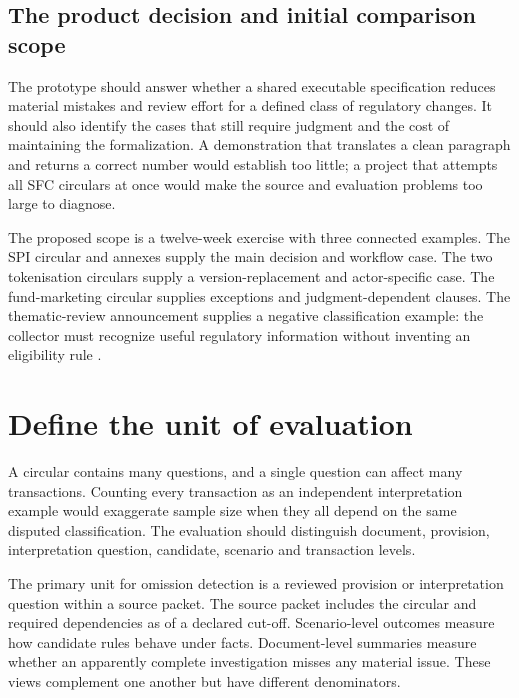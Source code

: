 \subsection{The product decision and initial comparison scope}
\label{merge:P-04-prototype:00}

\label{sec:prototype}

The prototype should answer whether a shared executable specification reduces
material mistakes and review effort for a defined class of regulatory changes.
It should also identify the cases that still require judgment and the cost of
maintaining the formalization. A demonstration that translates a clean paragraph
and returns a correct number would establish too little; a project that attempts
all SFC circulars at once would make the source and evaluation problems too large
to diagnose.

The proposed scope is a twelve-week exercise with three connected examples. The
SPI circular and annexes supply the main decision and workflow case. The two
tokenisation circulars supply a version-replacement and actor-specific case.
The fund-marketing circular supplies exceptions and judgment-dependent clauses.
The thematic-review announcement supplies a negative classification example:
the collector must recognize useful regulatory information without inventing an
eligibility rule \citep{sfcspi,sfctoken2023,sfctoken2026,sfcmarketing,sfcreview2025}.

\section{Define the unit of evaluation}
\label{merge:M09:01}


A circular contains many questions, and a single question can affect many
transactions. Counting every transaction as an independent interpretation example
would exaggerate sample size when they all depend on the same disputed
classification. The evaluation should distinguish document, provision,
interpretation question, candidate, scenario and transaction levels.

The primary unit for omission detection is a reviewed provision or interpretation
question within a source packet. The source packet includes the circular and
required dependencies as of a declared cut-off. Scenario-level outcomes measure
how candidate rules behave under facts. Document-level summaries measure whether
an apparently complete investigation misses any material issue. These views
complement one another but have different denominators.

